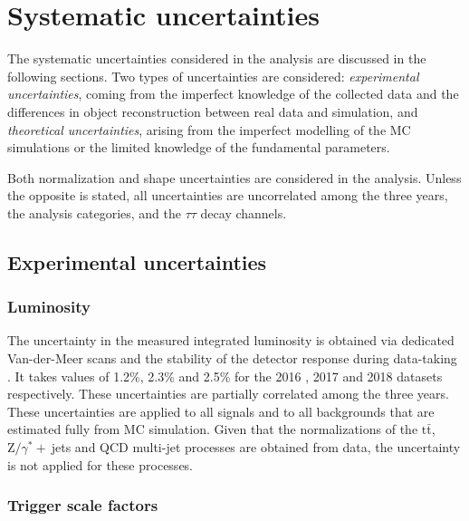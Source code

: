 \documentclass[../main.tex]{subfiles}
\begin{document}
\section{Systematic uncertainties}
\label{hh:sec:systematics}

The systematic uncertainties considered in the \hhbbtt{} analysis are discussed in the following sections. Two types of uncertainties are considered: \textit{experimental uncertainties}, coming from the imperfect knowledge of the collected data and the differences in object reconstruction between real data and simulation, and \textit{theoretical uncertainties}, arising from the imperfect modelling of the MC simulations or the limited knowledge of the fundamental parameters.

Both normalization and shape uncertainties are considered in the analysis. Unless the opposite is stated, all uncertainties are uncorrelated among the three years, the analysis categories, and the $\tau\tau$ decay channels.



\subsection*{Experimental uncertainties}

\subsubsection*{Luminosity}

The uncertainty in the measured integrated luminosity 
is obtained via dedicated Van-der-Meer scans and the stability of the detector response during data-taking \cite{lumi_1516}. It takes values of 1.2\%, 2.3\% and 2.5\% for the 2016 \cite{lumi_2016}, 2017 \cite{lumi_2017} and 2018 \cite{lumi_2018} datasets respectively. These uncertainties are partially correlated among the three years. These uncertainties are applied to all signals and to all backgrounds that are estimated fully from MC simulation. Given that the normalizations of the $\text{t}\bar{\text{t}}$, $\text{Z}/\gamma^*+~$jets and QCD multi-jet processes are obtained from data, the uncertainty is not applied for these processes.

\subsubsection*{Trigger scale factors}
\end{document}
